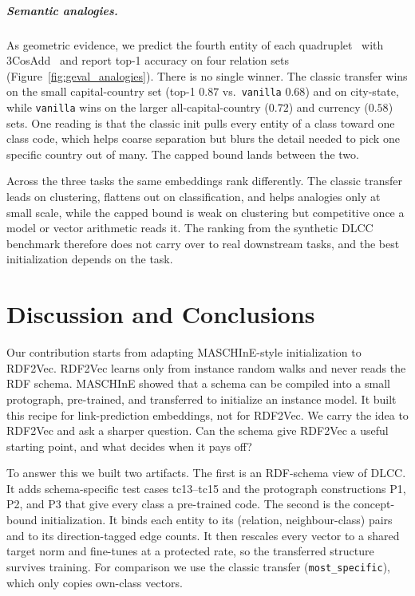 \documentclass[a4paper,oneside,bibliography=totoc]{scrbook}
\begin{document}
\paragraph{Semantic analogies.} As geometric evidence, we predict the fourth
entity of each quadruplet~\cite{mikolov_efficient_2013} with
3CosAdd~\cite{levy_linguistic_2014} and report top-1 accuracy on four relation
sets (Figure~\ref{fig:geval_analogies}). There is no single winner. The
classic transfer wins on the small capital-country set (top-1 $0.87$ vs.\
\texttt{vanilla} $0.68$) and on city-state, while \texttt{vanilla} wins on the
larger all-capital-country ($0.72$) and currency ($0.58$) sets. One reading is
that the classic init pulls every entity of a class toward one class code,
which helps coarse separation but blurs the detail needed to pick one specific
country out of many. The capped bound lands between the two.

Across the three tasks the same embeddings rank differently. The classic
transfer leads on clustering, flattens out on classification, and helps analogies
only at small scale, while the capped bound is weak on clustering but competitive
once a model or vector arithmetic reads it. The ranking from the synthetic DLCC
benchmark therefore does not carry over to real downstream tasks, and the best
initialization depends on the task.

\chapter{Discussion and Conclusions}
\label{ch:conclusion}
\label{sec:results_discussion}

Our contribution starts from adapting MASCHInE-style initialization to RDF2Vec.
RDF2Vec learns only from instance random walks and never reads the RDF schema.
MASCHInE showed that a schema can be compiled into a small protograph,
pre-trained, and transferred to initialize an instance model. It built this
recipe for link-prediction embeddings, not for RDF2Vec. We carry the idea to
RDF2Vec and ask a sharper question. Can the schema give RDF2Vec a useful starting
point, and what decides when it pays off?

To answer this we built two artifacts. The first is an RDF-schema view of DLCC.
It adds schema-specific test cases tc13--tc15 and the protograph constructions
P1, P2, and P3 that give every class a pre-trained code. The second is the
concept-bound initialization. It binds each entity to its (relation,
neighbour-class) pairs and to its direction-tagged edge counts. It then rescales
every vector to a shared target norm and fine-tunes at a protected rate, so the
transferred structure survives training. For comparison we use the classic
transfer (\texttt{most\_specific}), which only copies own-class vectors.
\end{document}
